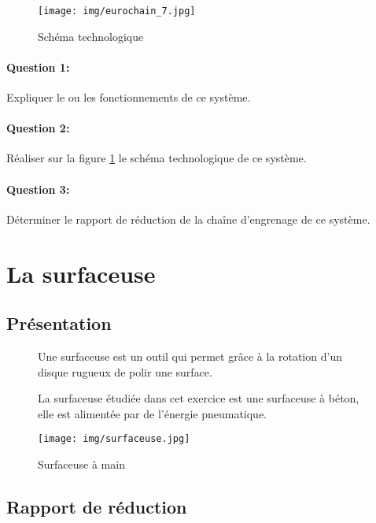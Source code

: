 \newpage

\begin{figure}[!ht]
 \centering\texttt{[image: img/eurochain\_7.jpg]}
 \caption{\label{fig75} Schéma technologique}
\end{figure}

\paragraph{Question 1:} Expliquer le ou les fonctionnements de ce système.

\paragraph{Question 2:} Réaliser sur la figure \ref{fig75} le schéma technologique de ce système.

\paragraph{Question 3:} Déterminer le rapport de réduction de la chaîne d'engrenage de ce système.

\newpage



\newpage

\section{La surfaceuse}

\subsection{Présentation}
\begin{figure}[!h]
\begin{minipage}{0.6\linewidth}
Une surfaceuse est un outil qui permet grâce à la rotation d'un disque rugueux de polir une surface.

La surfaceuse étudiée dans cet exercice est une surfaceuse à béton, elle est alimentée par de l'énergie pneumatique.
\end{minipage}
 \hfill
\begin{minipage}{0.35\linewidth}
 \centering\texttt{[image: img/surfaceuse.jpg]}
 \caption{Surfaceuse à main}
 \label{fig8}
\end{minipage}
\end{figure}

\subsection{Rapport de réduction}

